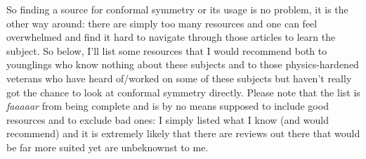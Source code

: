 So finding a source for conformal symmetry or its usage is no problem, it is the other way around: there are simply too many resources and one can feel overwhelmed and find it hard to navigate through those articles to learn the subject. So below, I'll list some resources that I would recommend both to \naive younglings who know nothing about these subjects and to those physics-hardened veterans who have heard of/worked on some of these subjects but haven't really got the chance to look at conformal symmetry directly. Please note that the list is \emph{faaaaar} from being complete and is by no means supposed to include good resources and to exclude bad ones: I simply listed what I know (and would recommend) and it is extremely likely that there are reviews out there that would be far more suited yet are unbeknownst to me.

